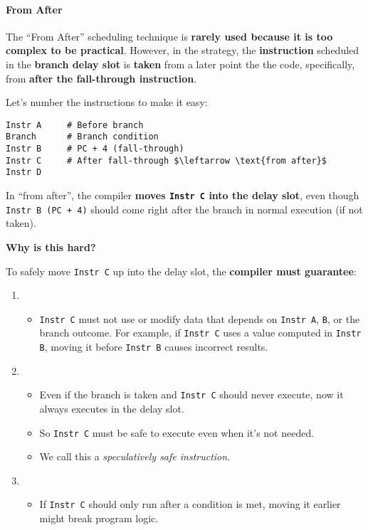 \paragraph{From After}\label{paragraph: From After}

The ``From After'' scheduling technique is \textbf{rarely used because it is too complex to be practical}. However, in the  strategy, the \textbf{instruction} scheduled in the \textbf{branch delay slot} is \textbf{taken} from a later point the the code, specifically, from \textbf{after the fall-through instruction}.

\highspace
Let's number the instructions to make it easy:
\begin{lstlisting}[language=riscv, mathescape=true]
Instr A     # Before branch
Branch      # Branch condition
Instr B     # PC + 4 (fall-through)
Instr C     # After fall-through $\leftarrow \text{from after}$
Instr D
\end{lstlisting}
In ``from after'', the compiler \textbf{moves \texttt{Instr C} into the delay slot}, even though \texttt{Instr B (PC + 4)} should come right after the branch in normal execution (if not taken).

\highspace
\begin{flushleft}
    \textcolor{Red2}{ \textbf{Why is this hard?}}
\end{flushleft}
To safely move \texttt{Instr C} up into the delay slot, the \textbf{compiler must guarantee}:
\begin{enumerate}
    \item {}
    \begin{itemize}
        \item \texttt{Instr C} must not use or modify data that depends on \texttt{Instr A}, \texttt{B}, or the branch outcome. For example, if \texttt{Instr C} uses a value computed in \texttt{Instr B}, moving it before \texttt{Instr B} causes incorrect results.
    \end{itemize}
    
    \item {}
    \begin{itemize}
        \item Even if the branch is taken and \texttt{Instr C} should never execute, now it always executes in the delay slot.
        \item So \texttt{Instr C} must be safe to execute even when it's not needed.
        \item We call this a \emph{speculatively safe instruction}.
    \end{itemize}
    
    \item {}
    \begin{itemize}
        \item If \texttt{Instr C} should only run after a condition is met, moving it earlier might break program logic.
    \end{itemize}
\end{enumerate}
